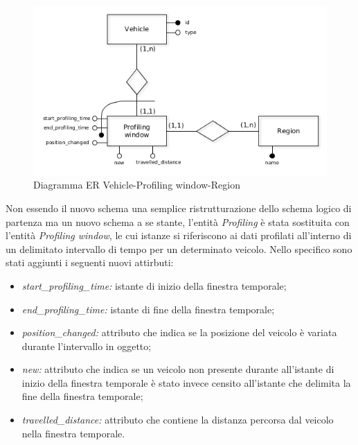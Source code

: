 \begin{figure}[H]                                                                                                                                                            
\centering                                                                                                                                                                   
\includegraphics[width=\textwidth]{diagrams/vehicle_interval_profiling_er}                                                                                                                                   
\caption{Diagramma ER Vehicle-Profiling window-Region}                                                                                                                                            
\label{fig:vehicle_interval_profiling_er}                                                                                                                                                           
\end{figure}

Non essendo il nuovo schema una semplice ristrutturazione dello
schema logico di partenza ma un nuovo schema a se stante, l'entità
\textit{Profiling} è stata sostituita con l'entità \textit{Profiling
window}, le cui istanze si riferiscono ai dati profilati all'interno di
un delimitato intervallo di tempo per un determinato veicolo.
Nello specifico sono stati aggiunti i seguenti nuovi attirbuti:
\begin{itemize}
\item \textit{start\_profiling\_time:} istante di inizio della finestra
temporale;
\item \textit{end\_profiling\_time:} istante di fine della finestra temporale;
\item \textit{position\_changed:} attributo che indica se la posizione
del veicolo è variata durante l'intervallo in oggetto;
\item \textit{new:} attributo che indica se un veicolo non presente durante
all'istante di inizio della finestra temporale è stato invece censito
all'istante che delimita la fine della finestra temporale;
\item \textit{travelled\_distance:} attributo che contiene la distanza 
percorsa dal veicolo nella finestra temporale.
\end{itemize}

